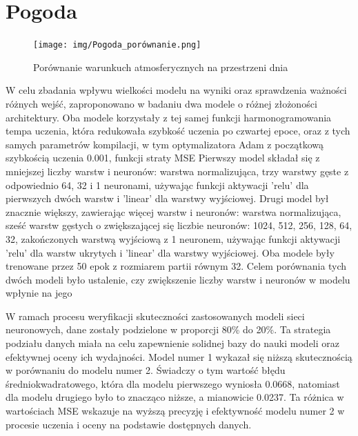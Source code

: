 \documentclass[a4paper,twoside,12pt]{book}
\begin{document}
\chapter{Pogoda}
\label{ch:0X}

\begin{figure}[!h]
	\centering
	\texttt{[image: img/Pogoda\_porównanie.png]}
	\caption{Porównanie warunkuch atmosferycznych na przestrzeni dnia}
	\label{fig:etykieta-rysunku}
\end{figure}
W celu zbadania wpływu wielkości modelu na wyniki oraz sprawdzenia ważności różnych wejść, zaproponowano w badaniu dwa modele o różnej złożoności architektury. Oba modele korzystały z tej samej funkcji harmonogramowania tempa uczenia, która redukowała szybkość uczenia po czwartej epoce, oraz z tych samych parametrów kompilacji, w tym optymalizatora Adam z początkową szybkością uczenia 0.001, funkcji straty MSE
Pierwszy model składał się z mniejszej liczby warstw i neuronów: warstwa normalizująca, trzy warstwy gęste z odpowiednio 64, 32 i 1 neuronami, używając funkcji aktywacji 'relu' dla pierwszych dwóch warstw i 'linear' dla warstwy wyjściowej.
Drugi model był znacznie większy, zawierając więcej warstw i neuronów: warstwa normalizująca, sześć warstw gęstych o zwiększającej się liczbie neuronów: 1024, 512, 256, 128, 64, 32, zakończonych warstwą wyjściową z 1 neuronem, używając funkcji aktywacji 'relu' dla warstw ukrytych i 'linear' dla warstwy wyjściowej.
Oba modele były trenowane przez 50 epok z rozmiarem partii równym 32. Celem porównania tych dwóch modeli było ustalenie, czy zwiększenie liczby warstw i neuronów w modelu wpłynie na jego

W ramach procesu weryfikacji skuteczności zastosowanych modeli sieci neuronowych, dane zostały podzielone w proporcji 80\% do 20\%. Ta strategia podziału danych miała na celu zapewnienie solidnej bazy do nauki modeli oraz efektywnej oceny ich wydajności. Model numer 1 wykazał się niższą skutecznością w porównaniu do modelu numer 2. Świadczy o tym wartość błędu średniokwadratowego, która dla modelu pierwszego wyniosła 0.0668, natomiast dla modelu drugiego było to znacząco niższe, a mianowicie 0.0237. Ta różnica w wartościach MSE wskazuje na wyższą precyzję i efektywność modelu numer 2 w procesie uczenia i oceny na podstawie dostępnych danych.
\end{document}
